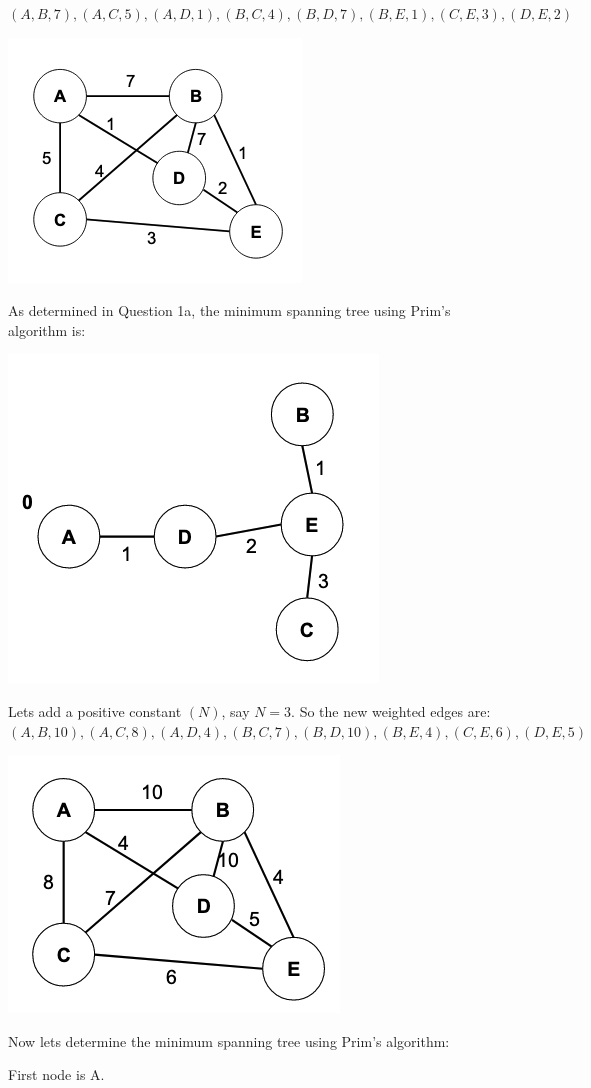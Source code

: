 \documentclass{article}
\begin{document}
\smallskip
$(A,B,7),(A,C,5),(A,D,1),(B,C,4),(B,D,7),(B,E,1),(C,E,3),(D,E,2)$

\begin{center}
    \includegraphics[width=.4\textwidth]{1.png}
\end{center}

As determined in Question 1a, the minimum spanning tree using Prim's algorithm is:

\begin{center}
    \includegraphics[width=.4\textwidth]{1a-5.png}
\end{center}

Lets add a positive constant $(N)$, say $N=3$. So the new weighted edges are:\\ $(A,B,10),(A,C,8),(A,D,4),(B,C,7),(B,D,10),(B,E,4),(C,E,6),(D,E,5)$\\

\begin{center}
    \includegraphics[width=.4\textwidth]{2a-1.png}
\end{center}

Now lets determine the minimum spanning tree using Prim's algorithm:

\smallskip
First node is A.
\end{document}

